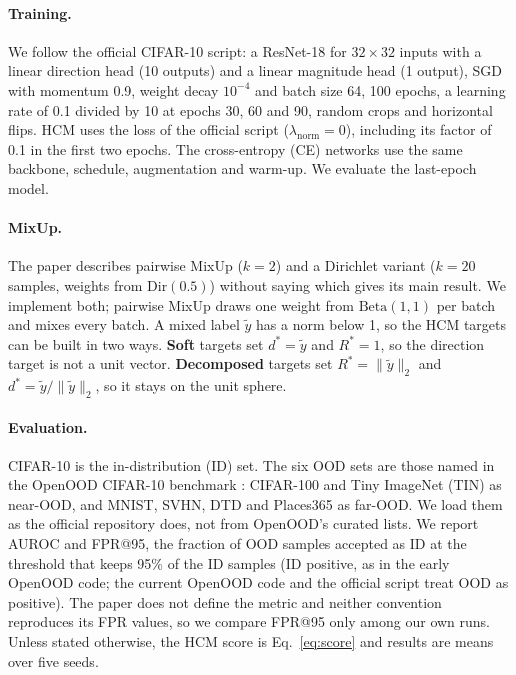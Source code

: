 \documentclass[letterpaper]{article} %
\begin{document}
\paragraph{Training.} We follow the official CIFAR-10 script: a ResNet-18 for $32\times32$ inputs \citep{he2016deep} with a linear direction head (10 outputs) and a linear magnitude head (1 output), SGD with momentum 0.9, weight decay $10^{-4}$ and batch size 64, 100 epochs, a learning rate of 0.1 divided by 10 at epochs 30, 60 and 90, random crops and horizontal flips. HCM uses the loss of the official script ($\lambda_{\text{norm}}=0$), including its factor of 0.1 in the first two epochs. The cross-entropy (CE) networks use the same backbone, schedule, augmentation and warm-up. We evaluate the last-epoch model.

\paragraph{MixUp.} The paper describes pairwise MixUp ($k=2$) and a Dirichlet variant ($k=20$ samples, weights from $\mathrm{Dir}(0.5)$) without saying which gives its main result. We implement both; pairwise MixUp draws one weight from $\mathrm{Beta}(1,1)$ per batch and mixes every batch. A mixed label $\tilde y$ has a norm below 1, so the HCM targets can be built in two ways. \textbf{Soft} targets set $d^*=\tilde y$ and $R^*=1$, so the direction target is not a unit vector. \textbf{Decomposed} targets set $R^*=\lVert\tilde y\rVert_2$ and $d^*=\tilde y/\lVert\tilde y\rVert_2$, so it stays on the unit sphere.

\paragraph{Evaluation.} CIFAR-10 is the in-distribution (ID) set. The six OOD sets are those named in the OpenOOD CIFAR-10 benchmark \citep{yang2022openood,zhang2023openood}: CIFAR-100 and Tiny ImageNet (TIN) as near-OOD, and MNIST, SVHN, DTD and Places365 as far-OOD. We load them as the official repository does, not from OpenOOD's curated lists. We report AUROC and FPR@95, the fraction of OOD samples accepted as ID at the threshold that keeps 95\% of the ID samples (ID positive, as in the early OpenOOD code; the current OpenOOD code and the official script treat OOD as positive). The paper does not define the metric and neither convention reproduces its FPR values, so we compare FPR@95 only among our own runs. Unless stated otherwise, the HCM score is Eq.~\eqref{eq:score} and results are means over five seeds.
\end{document}
